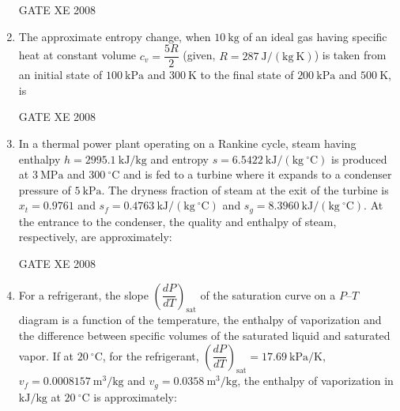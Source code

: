 \documentclass[12pt]{article}
\begin{document}
\begin{enumerate}[label=Q\arabic*.]
GATE XE 2008

\item The approximate entropy change, when $10\ \mathrm{kg}$ of an ideal gas having specific heat at constant volume $c_v = \dfrac{5R}{2}$ (given, $R = 287\ \mathrm{J/(kg\ K)}$) is taken from an initial state of $100\ \mathrm{kPa}$ and $300\ \mathrm{K}$ to the final state of $200\ \mathrm{kPa}$ and $500\ \mathrm{K}$, is  

\begin{enumerate}[label=(\Alph*)]
\end{enumerate}

GATE XE 2008

\item In a thermal power plant operating on a Rankine cycle, steam having enthalpy $h = 2995.1\ \mathrm{kJ/kg}$ and entropy $s = 6.5422\ \mathrm{kJ/(kg\ ^\circ C)}$ is produced at $3\ \mathrm{MPa}$ and $300\ ^\circ \mathrm{C}$ and is fed to a turbine where it expands to a condenser pressure of $5\ \mathrm{kPa}$. The dryness fraction of steam at the exit of the turbine is $x_t = 0.9761$ and $s_f = 0.4763\ \mathrm{kJ/(kg\ ^\circ C)}$ and $s_g = 8.3960\ \mathrm{kJ/(kg\ ^\circ C)}$. At the entrance to the condenser, the quality and enthalpy of steam, respectively, are approximately:  

\begin{enumerate}[label=(\Alph*)]
\end{enumerate}

GATE XE 2008

\item For a refrigerant, the slope $\left( \dfrac{dP}{dT} \right)_{\mathrm{sat}}$ of the saturation curve on a $P$–$T$ diagram is a function of the temperature, the enthalpy of vaporization and the difference between specific volumes of the saturated liquid and saturated vapor. If at $20\ ^\circ\mathrm{C}$, for the refrigerant, $\left( \dfrac{dP}{dT} \right)_{\mathrm{sat}} = 17.69\ \mathrm{kPa/K}$, $v_f = 0.0008157\ \mathrm{m^3/kg}$ and $v_g = 0.0358\ \mathrm{m^3/kg}$, the enthalpy of vaporization in $\mathrm{kJ/kg}$ at $20\ ^\circ\mathrm{C}$ is approximately:  


\end{enumerate}
\end{document}
